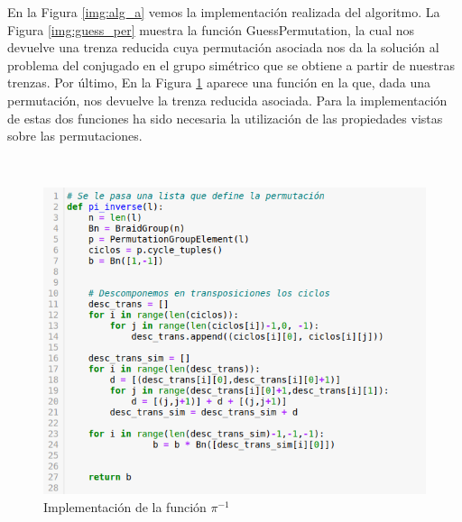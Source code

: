 \documentclass[12pt]{article}
\theoremstyle{definition}
\begin{document}
En la Figura \ref{img:alg_a} vemos la implementación realizada del algoritmo. La Figura \ref{img:guess_per} muestra la función GuessPermutation, la cual nos devuelve una trenza reducida cuya permutación asociada nos da la solución al problema del conjugado en el grupo simétrico que se obtiene a partir de nuestras trenzas. Por último, En la Figura \ref{img:pi_inverse} aparece una función en la que, dada una permutación, nos devuelve la trenza reducida asociada. Para la implementación de estas dos funciones ha sido necesaria la utilización de las propiedades vistas sobre las permutaciones.

\ 
\newline
\newline
\begin{figure}[h!]
\centering
\includegraphics[scale=0.5]{imgs/pi_inverse.png} 
\caption{Implementación de la función $\pi^{-1}$}
\label{img:pi_inverse}
\end{figure}
\ 
\newline
\newline
\end{document}
